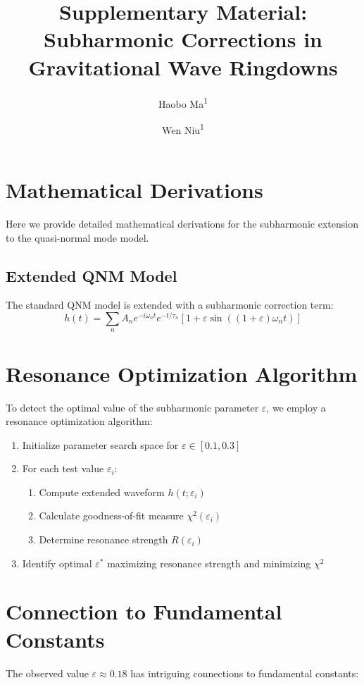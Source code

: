 \documentclass[a4paper,12pt]{article}
\title{Supplementary Material: Subharmonic Corrections in Gravitational Wave Ringdowns}
\author{Haobo Ma\textsuperscript{1} \and Wen Niu\textsuperscript{1}}
\date{\vspace{-5ex}}
\begin{document}
\maketitle

\section{Mathematical Derivations}
Here we provide detailed mathematical derivations for the subharmonic extension to the quasi-normal mode model.

\subsection{Extended QNM Model}
The standard QNM model is extended with a subharmonic correction term:
\begin{equation}
h(t) = \sum_n A_n e^{-i\omega_n t} e^{-t/\tau_n}[1 + \varepsilon \sin((1+\varepsilon)\omega_n t)]
\end{equation}

\section{Resonance Optimization Algorithm}
To detect the optimal value of the subharmonic parameter $\varepsilon$, we employ a resonance optimization algorithm:

\begin{enumerate}
\item Initialize parameter search space for $\varepsilon \in [0.1, 0.3]$
\item For each test value $\varepsilon_i$:
   \begin{enumerate}
   \item Compute extended waveform $h(t;\varepsilon_i)$
   \item Calculate goodness-of-fit measure $\chi^2(\varepsilon_i)$
   \item Determine resonance strength $R(\varepsilon_i)$
   \end{enumerate}
\item Identify optimal $\varepsilon^*$ maximizing resonance strength and minimizing $\chi^2$
\end{enumerate}

\section{Connection to Fundamental Constants}
The observed value $\varepsilon \approx 0.18$ has intriguing connections to fundamental constants:
\end{document}
